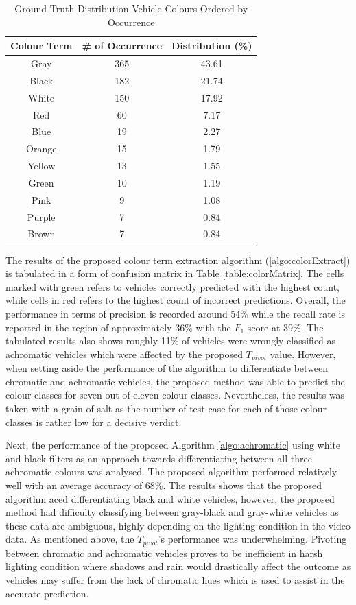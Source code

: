 \begin{table}[bht!]
\centering
\caption{Ground Truth Distribution Vehicle Colours Ordered by Occurrence}
\label{table:colorDist}
\begin{tabular}{ccc}
\toprule
Colour Term & \# of Occurrence & Distribution (\%)   \\
\midrule
Gray       & 365       & 43.61  \\
Black      & 182       & 21.74  \\
White      & 150       & 17.92  \\
Red        & 60        & 7.17   \\
Blue       & 19        & 2.27   \\
Orange     & 15        & 1.79   \\
Yellow     & 13        & 1.55   \\
Green      & 10        & 1.19   \\
Pink       & 9         & 1.08   \\
Purple     & 7         & 0.84   \\
Brown      & 7         & 0.84   \\
\bottomrule
\end{tabular}
\end{table}


The results of the proposed colour term extraction algorithm
(\ref{algo:colorExtract}) is tabulated in a form of confusion matrix in Table
\ref{table:colorMatrix}. The cells marked with green refers to vehicles
correctly predicted with the highest count, while cells in red refers to the
highest count of incorrect predictions. Overall, the performance in terms of
precision is recorded around 54\% while the recall rate is reported in the
region of approximately 36\% with the $F_1$ score at 39\%.
The tabulated results also shows roughly 11\% of vehicles were wrongly
classified as achromatic vehicles which were affected by the proposed
$T_{pivot}$ value. However, when setting aside the performance of the algorithm
to differentiate between chromatic and achromatic vehicles, the proposed method
was able to predict the colour classes for seven out of eleven colour classes.
Nevertheless, the results was taken with a grain of salt as the number of test
case for each of those colour classes is rather low for a decisive verdict.

Next, the performance of the proposed Algorithm \ref{algo:achromatic} using
white and black filters as an approach towards differentiating between all
three achromatic colours was analysed. The proposed algorithm performed
relatively well with an average accuracy of 68\%. The results shows that the
proposed algorithm aced differentiating black and white vehicles, however, the
proposed method had difficulty classifying between gray-black and gray-white
vehicles as these data are ambiguous, highly depending on the lighting
condition in the video data.
As mentioned above, the $T_{pivot}$'s performance was underwhelming. Pivoting
between chromatic and achromatic vehicles proves to be inefficient in harsh
lighting condition where shadows and rain would drastically affect the outcome
as vehicles may suffer from the lack of chromatic hues which is used to assist
in the accurate prediction.

